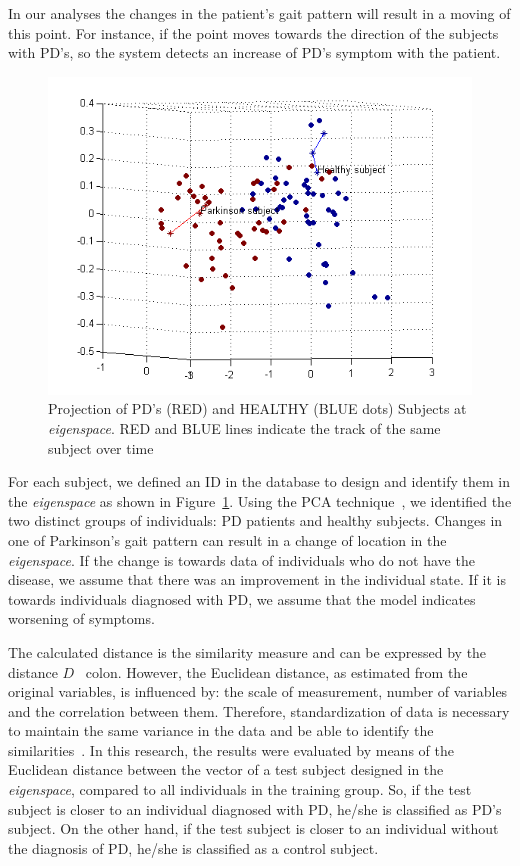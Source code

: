\documentclass[10pt, conference, compsocconf]{IEEEtran}
\begin{document}
In our analyses the changes in the patient's gait pattern will result in a moving of this point. For instance, if the point moves towards the direction of the subjects with PD's, so the system detects an increase of PD's symptom with the patient.

\begin{figure}
  \centering
  \includegraphics[scale=0.6]{./img/pca-projection-health-parkinson.png}
  \caption{Projection of PD's (RED) and HEALTHY (BLUE dots) Subjects at \textit{eigenspace}. RED and BLUE lines indicate the track of the same subject over time
}
  \label{fig:projecaopcaparkinson}
\end{figure}

For each subject, we defined an ID in the database to design and identify them in the \textit{eigenspace} as shown in Figure~\ref{fig:projecaopcaparkinson}. Using the PCA technique~\cite{Shlens05atutorial}, we identified the two distinct groups of individuals: PD patients and healthy subjects. Changes in one of Parkinson's gait pattern can result in a change of location in the \textit{eigenspace}. If the change is towards data of individuals who do not have the disease, we assume that there was an improvement in the individual state. If it is towards individuals diagnosed with PD, we assume that the model indicates worsening of symptoms.

The calculated distance is the similarity measure and can be expressed by the distance $ D $ \ colon. However, the Euclidean distance, as estimated from the original variables, is influenced by: the scale of measurement, number of variables and the correlation between them. Therefore, standardization of data is necessary to maintain the same variance in the data and be able to identify the similarities~\cite{dillmann2014}. In this research, the results were evaluated by means of the Euclidean distance between the vector of a test subject designed in the \textit{eigenspace}, compared to all individuals in the training group. So, if the test subject is closer to an individual diagnosed with PD, he/she is classified as PD's subject. On the other hand, if the test subject is closer to an individual without the diagnosis of PD, he/she is classified as a control subject.
\end{document}
